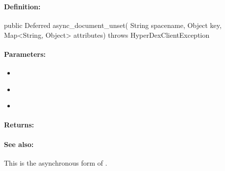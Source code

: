 \pagebreak
\subsubsection{}
\label{api:java:async_document_unset}


\paragraph{Definition:}
\begin{javacode}
public Deferred async_document_unset(
        String spacename,
        Object key,
        Map<String, Object> attributes) throws HyperDexClientException
\end{javacode}

\paragraph{Parameters:}
\begin{itemize}[noitemsep]
\item {}\\

\item {}\\

\item {}\\

\end{itemize}

\paragraph{Returns:}


\paragraph{See also:}  This is the asynchronous form of .

\pagebreak
\subsubsection{}
\label{api:java:cond_document_unset}


